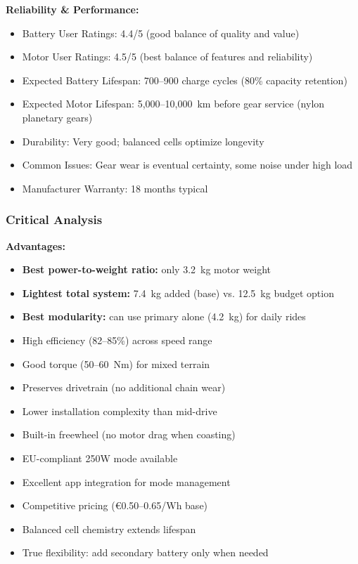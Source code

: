\documentclass[12pt,a4paper]{article}
\begin{document}
\textbf{Reliability \& Performance:}
\begin{itemize}
    \item Battery User Ratings: 4.4/5 (good balance of quality and value) \cite{aliexpress-batteries, amazon-components}
    \item Motor User Ratings: 4.5/5 (best balance of features and reliability) \cite{endless-sphere, ebike-review}
    \item Expected Battery Lifespan: 700--900 charge cycles (80\% capacity retention)
    \item Expected Motor Lifespan: 5,000--10,000~km before gear service (nylon planetary gears)
    \item Durability: Very good; balanced cells optimize longevity
    \item Common Issues: Gear wear is eventual certainty, some noise under high load
    \item Manufacturer Warranty: 18 months typical
\end{itemize}

\subsubsection{Critical Analysis}

\textbf{Advantages:}
\begin{itemize}
    \item \textbf{Best power-to-weight ratio:} only 3.2~kg motor weight
    \item \textbf{Lightest total system:} 7.4~kg added (base) vs. 12.5~kg budget option
    \item \textbf{Best modularity:} can use primary alone (4.2~kg) for daily rides
    \item High efficiency (82--85\%) across speed range
    \item Good torque (50--60~Nm) for mixed terrain
    \item Preserves drivetrain (no additional chain wear)
    \item Lower installation complexity than mid-drive
    \item Built-in freewheel (no motor drag when coasting)
    \item EU-compliant 250W mode available
    \item Excellent app integration for mode management
    \item Competitive pricing (€0.50--0.65/Wh base)
    \item Balanced cell chemistry extends lifespan
    \item True flexibility: add secondary battery only when needed
\end{itemize}
\end{document}
